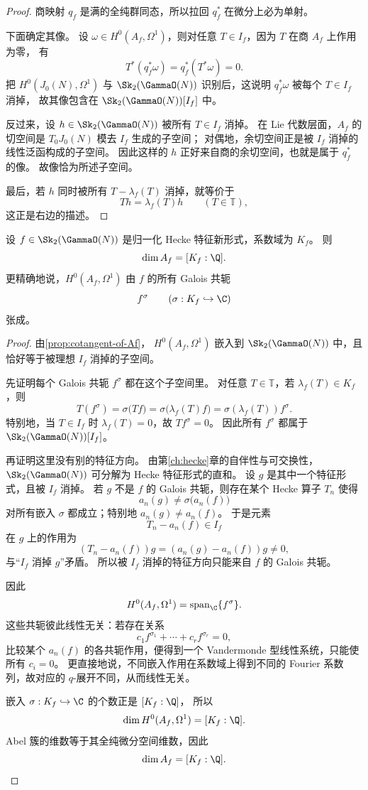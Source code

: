 \begin{proof}
商映射 $q_f$ 是满的全纯群同态，所以拉回 $q_f^*$ 在微分上必为单射。

下面确定其像。
设 $\omega\in H^0(A_f,\Omega^1)$，则对任意 $T\in I_f$，因为 $T$ 在商 $A_f$ 上作用为零，
有
\[
  T^*(q_f^*\omega)=q_f^*(T^*\omega)=0.
\]
把 $H^0(J_0(N),\Omega^1)$ 与 $\Sk_2(\GammaO(N))$ 识别后，这说明 $q_f^*\omega$ 被每个 $T\in I_f$ 消掉，
故其像包含在 $\Sk_2(\GammaO(N))[I_f]$ 中。

反过来，设 $h\in \Sk_2(\GammaO(N))$ 被所有 $T\in I_f$ 消掉。
在 Lie 代数层面，$A_f$ 的切空间是 $T_0J_0(N)$ 模去 $I_f$ 生成的子空间；
对偶地，余切空间正是被 $I_f$ 消掉的线性泛函构成的子空间。
因此这样的 $h$ 正好来自商的余切空间，也就是属于 $q_f^*$ 的像。
故像恰为所述子空间。

最后，若 $h$ 同时被所有 $T-\lambda_f(T)$ 消掉，就等价于
\[
  Th=\lambda_f(T)h \qquad (T\in\mathbb T),
\]
这正是右边的描述。
\end{proof}

\begin{theorem}
\label{thm:dim-Af}
设 $f\in \Sk_2(\GammaO(N))$ 是归一化 Hecke 特征新形式，系数域为 $K_f$。
则
\[
  \dim A_f=[K_f:\Q].
\]
更精确地说，$H^0(A_f,\Omega^1)$ 由 $f$ 的所有 Galois 共轭
\[
  f^\sigma \qquad (\sigma:K_f\hookrightarrow \C)
\]
张成。
\end{theorem}

\begin{proof}
由\cref{prop:cotangent-of-Af}，
$H^0(A_f,\Omega^1)$ 嵌入到 $\Sk_2(\GammaO(N))$ 中，且恰好等于被理想 $I_f$ 消掉的子空间。

先证明每个 Galois 共轭 $f^\sigma$ 都在这个子空间里。
对任意 $T\in\mathbb T$，若 $\lambda_f(T)\in K_f$，则
\[
  T(f^\sigma)=\sigma\bigl(Tf\bigr)=\sigma\bigl(\lambda_f(T)f\bigr)=\sigma(\lambda_f(T))f^\sigma.
\]
特别地，当 $T\in I_f$ 时 $\lambda_f(T)=0$，故 $Tf^\sigma=0$。
因此所有 $f^\sigma$ 都属于 $\Sk_2(\GammaO(N))[I_f]$。

再证明这里没有别的特征方向。
由第\ref{ch:hecke}章的自伴性与可交换性，$\Sk_2(\GammaO(N))$ 可分解为 Hecke 特征形式的直和。
设 $g$ 是其中一个特征形式，且被 $I_f$ 消掉。
若 $g$ 不是 $f$ 的 Galois 共轭，则存在某个 Hecke 算子 $T_n$ 使得
\[
  a_n(g)\neq \sigma\bigl(a_n(f)\bigr)
\]
对所有嵌入 $\sigma$ 都成立；特别地 $a_n(g)\neq a_n(f)$。
于是元素
\[
  T_n-a_n(f)\in I_f
\]
在 $g$ 上的作用为
\[
  (T_n-a_n(f))g=(a_n(g)-a_n(f))g\neq 0,
\]
与“$I_f$ 消掉 $g$”矛盾。
所以被 $I_f$ 消掉的特征方向只能来自 $f$ 的 Galois 共轭。

因此
\[
  H^0(A_f,\Omega^1)=\operatorname{span}_\C\{f^\sigma\}.
\]
这些共轭彼此线性无关：若存在关系
\[
  c_1f^{\sigma_1}+\cdots+c_rf^{\sigma_r}=0,
\]
比较某个 $a_n(f)$ 的各共轭作用，便得到一个 Vandermonde 型线性系统，只能使所有 $c_i=0$。
更直接地说，不同嵌入作用在系数域上得到不同的 Fourier 系数列，故对应的 $q$-展开不同，从而线性无关。

嵌入 $\sigma:K_f\hookrightarrow\C$ 的个数正是 $[K_f:\Q]$，
所以
\[
  \dim H^0(A_f,\Omega^1)=[K_f:\Q].
\]
Abel 簇的维数等于其全纯微分空间维数，因此
\[
  \dim A_f=[K_f:\Q].
\]
\end{proof}

